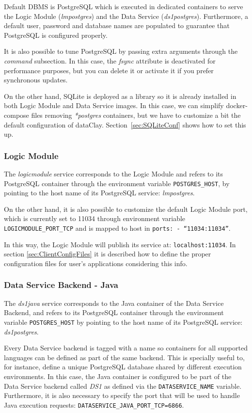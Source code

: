 Default DBMS is PostgreSQL which is executed in dedicated containers to serve the Logic Module (\textit{lmpostgres}) and the Data Service (\textit{ds1postgres}). Furthermore, a default user, password and database names are populated to guarantee that PostgreSQL is configured properly.

It is also possible to tune PostgreSQL by passing extra arguments through the \textit{command} subsection. In this case, the \textit{fsync} attribute is deactivated for performance purposes, but you can delete it or activate it if you prefer synchronous updates.

On the other hand, SQLite is deployed as a library so it is already installed in both Logic Module and Data Service images. In this case, we can simplify docker-compose files removing \textit{*postgres} containers, but we have to customize a bit the default configuration of dataClay. Section~\ref{sec:SQLiteConf} shows how to set this up.


\subsubsection{Logic Module}
The \textit{logicmodule}  service corresponds to the Logic Module and refers to its PostgreSQL container through the environment variable \texttt{POSTGRES\_HOST}, by pointing to the host name of its PostgreSQL service: \textit{lmpostgres}.

On the other hand, it is also possible to customize the default Logic Module port, which is currently set to 11034 through environment variable \texttt{LOGICMODULE\_PORT\_TCP} and is mapped to host in \texttt{ports: - ``11034:11034''}. 

In this way, the Logic Module will publish its service at: \texttt{localhost:11034}. In section \ref{sec:ClientConfigFiles} it is described how to define the proper configuration files for user's applications considering this info.

\subsubsection{Data Service Backend - Java}
The \textit{ds1java}  service corresponds to the Java container of the Data Service Backend, and refers to its PostgreSQL container through the environment variable \texttt{POSTGRES\_HOST} by pointing to the host name of its PostgreSQL service: \textit{ds1postgres}.

Every Data Service backend is tagged with a name so containers for all supported languages can be defined as part of the same backend. This is specially useful to, for instance, define a unique PostgreSQL database shared by different execution environments. In this case, the Java container is configured to be part of the Data Service backend called \textit{DS1} as defined via the \texttt{DATASERVICE\_NAME} variable. Furthermore, it is also necessary to specify the port that will be used to handle Java execution requests: \texttt{DATASERVICE\_JAVA\_PORT\_TCP=6866}.

